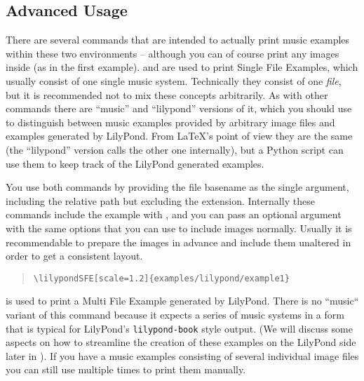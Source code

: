 \documentclass{OLLbook}
\begin{document}
\subsection{Advanced Usage}
\label{subsec:xmp_advanced-usage}

There are several commands that are intended to actually print music examples within these two environments -- although you can of course print any images inside (as in the first example).
 and  are used to print Single File Examples, which usually consist of one single music system.
Technically they consist of one \emph{file}, but it is recommended not to mix these concepts arbitrarily.
As with other commands there are “music” and “lilypond” versions of it, which  you should use to distinguish between music examples provided by arbitrary image files and examples generated by LilyPond.
From \LaTeX's point of view they are the same (the “lilypond” version calls the other one internally), but a Python script can use them to keep track of the LilyPond generated examples.

You use both commands by providing the file basename as the single argument, including the relative path but excluding the extension.
Internally these commands include the example with , and you can pass an optional argument with the same options that you can use to include images normally.
Usually it is recommendable to prepare the images in advance and include them unaltered in order to get a consistent layout.


\begin{quote}
\begin{verbatim}
\lilypondSFE[scale=1.2]{examples/lilypond/example1}
\end{verbatim}
\end{quote}

 is used to print a Multi File Example generated by LilyPond.
There is no “music“ variant of this command because it expects a series of music systems in a form that is typical for LilyPond's \texttt{lilypond-book} style output.
(We will discuss some aspects on how to streamline the creation of these examples on the LilyPond side later in ).
If you have a music examples consisting of several individual image files you can still use  multiple times to print them manually.
\end{document}
